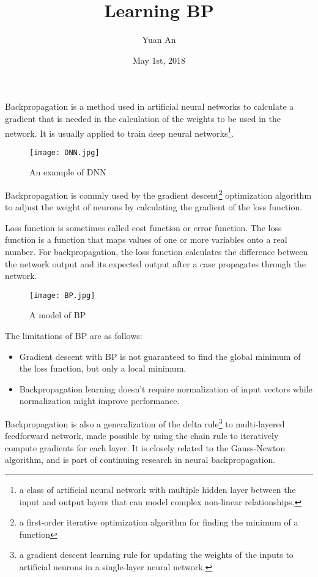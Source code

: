 \documentclass[a4paper,12pt,twocolumn]{article}
\title{Learning BP}
\author{Yuan An}
\date{May 1st, 2018}
\begin{document}
\maketitle
Backpropagation\cite{BPwikipedia} is a method used in artificial neural networks to calculate a gradient that is needed in the calculation of the weights to be used in the network. It is usually applied to train deep neural networks\footnote{a class of artificial neural network with multiple hidden layer between the input and output layers that can model complex non-linear relationships.}\cite{DNNwikipedia}.
\begin{figure}[h]
	\centering
	\texttt{[image: DNN.jpg]}
	\caption{An example of DNN}\label{DNNfigure}
\end{figure}
\par
Backpropagation is commly used by the gradient descent\footnote{a first-order iterative optimization algorithm for finding the minimum of a function} optimization algorithm to adjust the weight of neurons by calculating the gradient of the loss function.
\par
Loss function is sometimes called cost function or error function. The loss function is a function that maps values of one or more variables onto a real number. For backpropagation, the loss function calculates the difference between the network output and its expected output after a case propagates through the network.
\begin{figure}[h]
	\centering
	\texttt{[image: BP.jpg]}
	\caption{A model of BP}\label{BPfigure}
\end{figure}
\par
The limitations of BP are as follows:
\begin{itemize}
	\item Gradient descent with BP is not guaranteed to find the global minimum of the loss function, but only a local minimum.
	\item Backpropagation learning doesn't require normalization of input vectors while normalization might improve performance.
\end{itemize}
\par
Backpropagation is also a generalization of the delta rule\footnote{a gradient descent learning rule for updating the weights of the inputs to artificial neurons in a single-layer neural network.} to multi-layered feedforward network, made possible by using the chain rule to iteratively compute gradients for each layer. It is closely related to the Gauss-Newton algorithm, and is part of continuing research in neural backpropagation.


\end{document}
